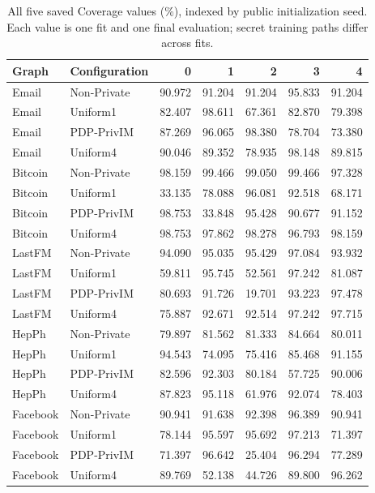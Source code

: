 \begin{table}[htbp]
\centering\small
\caption{All five saved Coverage values (\%), indexed by public initialization seed. Each value is one fit and one final evaluation; secret training paths differ across fits.}\label{tab:seedrows}
\begin{tabular}{llrrrrr}
\toprule
Graph & Configuration & 0 & 1 & 2 & 3 & 4\\ \midrule
Email & Non-Private & 90.972 & 91.204 & 91.204 & 95.833 & 91.204 \\
Email & Uniform1 & 82.407 & 98.611 & 67.361 & 82.870 & 79.398 \\
Email & PDP-PrivIM & 87.269 & 96.065 & 98.380 & 78.704 & 73.380 \\
Email & Uniform4 & 90.046 & 89.352 & 78.935 & 98.148 & 89.815 \\
Bitcoin & Non-Private & 98.159 & 99.466 & 99.050 & 99.466 & 97.328 \\
Bitcoin & Uniform1 & 33.135 & 78.088 & 96.081 & 92.518 & 68.171 \\
Bitcoin & PDP-PrivIM & 98.753 & 33.848 & 95.428 & 90.677 & 91.152 \\
Bitcoin & Uniform4 & 98.753 & 97.862 & 98.278 & 96.793 & 98.159 \\
LastFM & Non-Private & 94.090 & 95.035 & 95.429 & 97.084 & 93.932 \\
LastFM & Uniform1 & 59.811 & 95.745 & 52.561 & 97.242 & 81.087 \\
LastFM & PDP-PrivIM & 80.693 & 91.726 & 19.701 & 93.223 & 97.478 \\
LastFM & Uniform4 & 75.887 & 92.671 & 92.514 & 97.242 & 97.715 \\
HepPh & Non-Private & 79.897 & 81.562 & 81.333 & 84.664 & 80.011 \\
HepPh & Uniform1 & 94.543 & 74.095 & 75.416 & 85.468 & 91.155 \\
HepPh & PDP-PrivIM & 82.596 & 92.303 & 80.184 & 57.725 & 90.006 \\
HepPh & Uniform4 & 87.823 & 95.118 & 61.976 & 92.074 & 78.403 \\
Facebook & Non-Private & 90.941 & 91.638 & 92.398 & 96.389 & 90.941 \\
Facebook & Uniform1 & 78.144 & 95.597 & 95.692 & 97.213 & 71.397 \\
Facebook & PDP-PrivIM & 71.397 & 96.642 & 25.404 & 96.294 & 77.289 \\
Facebook & Uniform4 & 89.769 & 52.138 & 44.726 & 89.800 & 96.262 \\
\bottomrule\end{tabular}
\end{table}
